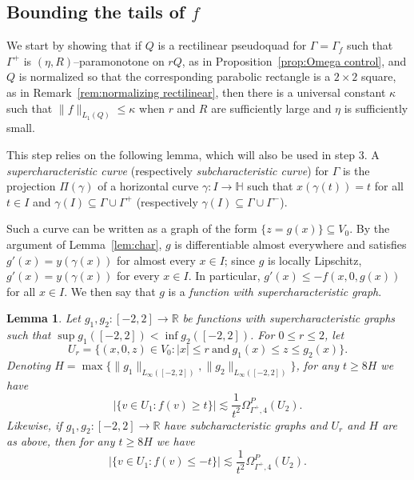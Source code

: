 \documentclass[11pt,reqno]{amsart}
\renewcommand{\H}{\mathbb{H}}
\newcommand{\R}{\mathbb{R}}
\newcommand{\0}{\mathbf{0}}
\renewcommand{\1}{\mathbf 1}
\newcommand{\from}{\colon}
\renewcommand{\mid}{:}
\renewcommand{\subset}{\subseteq}
\renewcommand{\ge}{\geqslant}
\renewcommand{\le}{\leqslant}
\newtheorem{lemma}[thm]{Lemma}
\theoremstyle{remark}
\begin{document}
\subsection{Bounding the tails of $f$}

We start by showing that if $Q$ is a rectilinear pseudoquad for $\Gamma=\Gamma_f$ such that $\Gamma^+$ is $(\eta, R)$--paramonotone on $rQ$, as in Proposition~\ref{prop:Omega control}, and $Q$ is normalized so that the corresponding parabolic rectangle is a $2\times 2$ square, as in Remark~\ref{rem:normalizing rectilinear}, then there is a universal constant $\kappa$ such that $\|f\|_{L_1(Q)}\le \kappa$ when $r$ and $R$ are sufficiently large and $\eta$ is sufficiently small.

This step relies on the following lemma, which will also be used in step 3.  A \emph{supercharacteristic curve} (respectively \emph{subcharacteristic curve}) for $\Gamma$ is the projection $\Pi(\gamma)$ of a horizontal curve $\gamma\from I\to \H$ such that $x(\gamma(t))=t$ for all $t\in I$ and $\gamma(I)\subset \Gamma\cup \Gamma^+$ (respectively $\gamma(I)\subset \Gamma\cup \Gamma^-$).

Such a curve can be written as a graph of the form $\{z=g(x)\}\subset V_0$. By the argument of Lemma~\ref{lem:char}, $g$ is differentiable almost everywhere and satisfies $g'(x)=y(\gamma(x))$ for almost every $x\in I$; since $g$ is locally Lipschitz, $g'(x)=y(\gamma(x))$ for every $x\in I$. In particular, $g'(x)\le -f(x,0,g(x))$ for all $x\in I$.  We then say that $g$ is a \emph{function with supercharacteristic graph}.

\begin{lemma}\label{lem:supercharacteristic bounds}
  Let $g_1,g_2 \from [-2,2]\to \R$ be functions with supercharacteristic graphs such that $\sup g_1([-2,2]) < \inf g_2([-2,2])$.  For $0\le r\le 2$, let
  $$U_r=\{(x,0,z) \in V_0\mid |x|\le r\ \mathrm{and}\  g_1(x)\le z\le g_2(x)\}.$$
  Denoting $H=\max\{\|g_1\|_{L_\infty([-2,2])}, \|g_2\|_{L_\infty([-2,2])}\}$, for any $t\ge 8H$ we have
  \begin{equation}\label{eq:supercharacteristic tail bound}
    |\{v\in U_1\mid f(v)\ge t\}| \lesssim \frac{1}{t^{2}} \Omega^P_{\Gamma^+,4}(U_2).
  \end{equation}
  Likewise, if $g_1,g_2 \from [-2,2]\to \R$ have subcharacteristic graphs and $U_r$ and $H$ are as above, then for any $t\ge 8H$ we have
  $$|\{v\in U_1\mid f(v)\le -t\}| \lesssim \frac{1}{t^{2}} \Omega^P_{\Gamma^+,4}(U_2).$$
\end{lemma}
\end{document}
